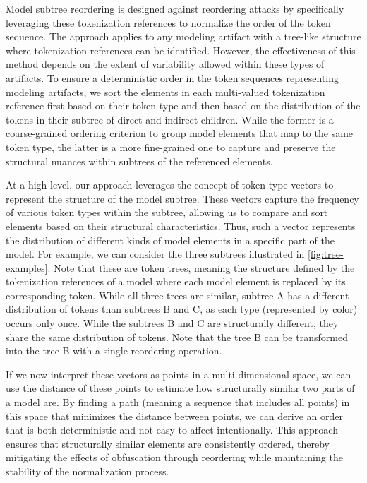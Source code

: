 Model subtree reordering is designed against reordering attacks by specifically leveraging these tokenization references to normalize the order of the token sequence. 
The approach applies to any modeling artifact with a tree-like structure where tokenization references can be identified. However, the effectiveness of this method depends on the extent of variability allowed within these types of artifacts.
%
To ensure a deterministic order in the token sequences representing modeling artifacts, we sort the elements in each multi-valued tokenization reference first based on their token type and then based on the distribution of the tokens in their subtree of direct and indirect children.
While the former is a coarse-grained ordering criterion to group model elements that map to the same token type, the latter is a more fine-grained one to capture and preserve the structural nuances within subtrees of the referenced elements.

At a high level, our approach leverages the concept of token type vectors to represent the structure of the model subtree. These vectors capture the frequency of various token types within the subtree, allowing us to compare and sort elements based on their structural characteristics. Thus, such a vector represents the distribution of different kinds of model elements in a specific part of the model. For example, we can consider the three subtrees illustrated in \autoref{fig:tree-examples}. Note that these are token trees, meaning the structure defined by the tokenization references of a model where each model element is replaced by its corresponding token. While all three trees are similar, subtree A has a different distribution of tokens than subtrees B and C, as each type (represented by color) occurs only once. While the subtrees B and C are structurally different, they share the same distribution of tokens. Note that the tree B can be transformed into the tree B with a single reordering operation.

If we now interpret these vectors as points in a multi-dimensional space, we can use the distance of these points to estimate how structurally similar two parts of a model are. By finding a path (meaning a sequence that includes all points) in this space that minimizes the distance between points, we can derive an order that is both deterministic and not easy to affect intentionally. This approach ensures that structurally similar elements are consistently ordered, thereby mitigating the effects of obfuscation through reordering while maintaining the stability of the normalization process.


